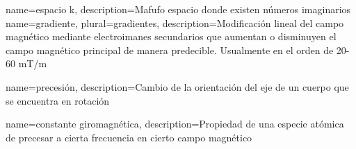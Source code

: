 
 {name={espacio k}, description={Mafufo espacio donde existen números imaginarios}}
 {name={gradiente},
                              plural={gradientes},
                              description={Modificación lineal del campo magnético mediante electroimanes secundarios que aumentan o disminuyen el campo magnético principal de manera predecible. Usualmente en el orden de 20-60 mT/m}}


 {name={precesión},
                            description={Cambio de la orientación del eje de un cuerpo que se encuentra en rotación}}

 {name={constante giromagnética},
                            description={Propiedad de una especie atómica de precesar a cierta frecuencia en cierto campo magnético}}
